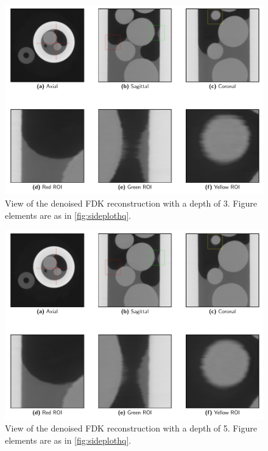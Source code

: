 \begin{figure}[htbp]
  \centering
  \includegraphics[width=.9\textwidth]{figures/kimrobertdepth3-x475y620s250.pdf}
  \caption[Depth=3]{View of the denoised FDK reconstruction with a depth of 3. Figure elements are as in \cref{fig:sideplothq}. }
  \label{fig:sideplotdepth3}
\end{figure}

\begin{figure}[htbp]
  \centering
  \includegraphics[width=.9\textwidth]{figures/kimrobertdepth5-x475y620s250.pdf}
  \caption[Depth=5]{View of the denoised FDK reconstruction with a depth of 5. Figure elements are as in \cref{fig:sideplothq}. }
  \label{fig:sideplotdepth5}
\end{figure}

